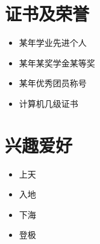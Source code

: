 \documentclass[11pt]{ctexart}
\newcommand{\primarycolor}{\color{CUGblue}}
\newlength{\iconwidth}
\begin{document}
	
    
	\begin{minipage}[t]{0.6\textwidth}
		\section[证书及荣誉]{\makebox[\iconwidth][c]{\primarycolor{\faMedal}}\quad 证书及荣誉}
			\begin{itemize}
			\setlength{\itemsep}{0.5em}
				\item 某年学业先进个人
				\item 某年某奖学金某等奖
				\item 某年优秀团员称号
				\item 计算机几级证书
			\end{itemize}
	\end{minipage}
	\hfill
	\begin{minipage}[t]{0.35\textwidth}
		\section[兴趣爱好]{\makebox[\iconwidth][c]{\primarycolor{\faPalette}}\quad 兴趣爱好}
			\begin{itemize}
			\setlength{\itemsep}{0.5em}
				\item 上天
				\item 入地
				\item 下海
				\item 登极
			\end{itemize}

		\vspace{1.2em}
		\end{minipage}
	

\end{document}
